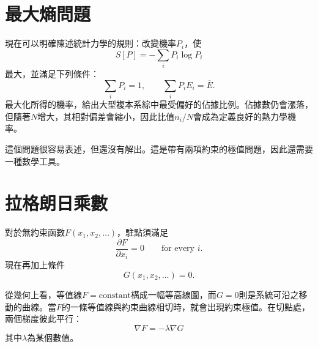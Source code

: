 \section{最大熵問題}

現在可以明確陳述統計力學的規則：改變機率\(P_i\)，使\begin{equation}
 S[P]=-\sum_iP_i\log P_i
 \label{eq:sm3-maximize-entropy}
\end{equation}最大，並滿足下列條件：\begin{equation}
 \sum_iP_i=1,
 \qquad
 \sum_iP_iE_i=\overline E.
 \label{eq:sm3-maxent-constraints}
\end{equation}最大化所得的機率，給出大型複本系綜中最受偏好的佔據比例。佔據數仍會漲落，但隨著\(N\)增大，其相對偏差會縮小，因此比值\(n_i/N\)會成為定義良好的熱力學機率。

\begin{classroomqa}\end{classroomqa}

這個問題很容易表述，但還沒有解出。這是帶有兩項約束的極值問題，因此還需要一種數學工具。

\section{拉格朗日乘數}

對於無約束函數\(F(x_1,x_2,\ldots)\)，駐點須滿足\begin{equation}
 \frac{\partial F}{\partial x_i}=0
 \qquad\text{for every }i.
 \label{eq:sm3-unconstrained-stationary}
\end{equation}現在再加上條件\begin{equation}
 G(x_1,x_2,\ldots)=0.
 \label{eq:sm3-one-constraint}
\end{equation}

\begin{classroomqa}\end{classroomqa}

從幾何上看，等值線\(F=\text{constant}\)構成一幅等高線圖，而\(G=0\)則是系統可沿之移動的曲線。當\(F\)的一條等值線與約束曲線相切時，就會出現約束極值。在切點處，兩個梯度彼此平行：\begin{equation}
 \nabla F=-\lambda\nabla G
 \label{eq:sm3-parallel-gradients}
\end{equation}其中\(\lambda\)為某個數值。

